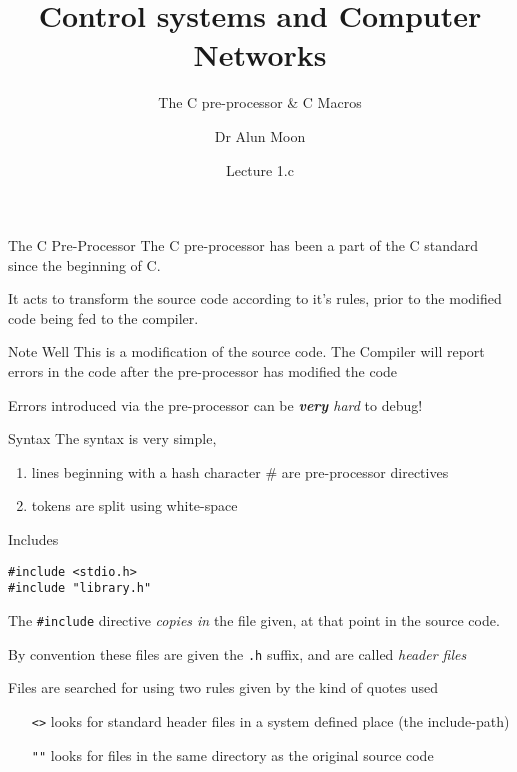\documentclass[xcolor=svgnames]{beamer}
\title{Control systems and Computer Networks}
\subtitle{The C pre-processor \& C Macros}
\author{Dr Alun Moon}
\date{Lecture 1.c}
\begin{document}
\frame{\maketitle}

\begin{frame}{The C Pre-Processor}
The C pre-processor has been a part of the C standard since the beginning of C.

It acts to transform the source code according to it's rules, prior to the modified code being fed to the compiler.

\begin{alertblock}{Note Well}
    This is a \alert{modification} of the source code.  The Compiler will report errors in the code \alert{after} the pre-processor has modified the code
\end{alertblock}

Errors introduced via the pre-processor can be \alert{\emph{\textbf{very} hard}} to debug!
\end{frame}

\begin{frame}{Syntax}
The syntax is very simple,
\begin{enumerate}
    \item lines beginning with a hash character \alert{\#} are pre-processor directives
    \item tokens are split using white-space
\end{enumerate}

\end{frame}

\begin{frame}[fragile]{Includes}
\begin{tcolorbox}
\begin{verbatim}
#include <stdio.h>
#include "library.h"
\end{verbatim}
\end{tcolorbox}

The \texttt{#include} directive \alert{\emph{copies in}} the file given, at that point in the source code.

By convention these files are given the \texttt{.h} suffix, and are called \alert{\emph{header files}}

Files are searched for using two rules given by the kind of quotes used
\begin{itemize}
    \item[\texttt{<>}] looks for standard header files in a system defined place (the include-path)
    \item[\texttt{""}] looks for files in the same directory as the original source code
\end{itemize}

\end{frame}
\end{document}
